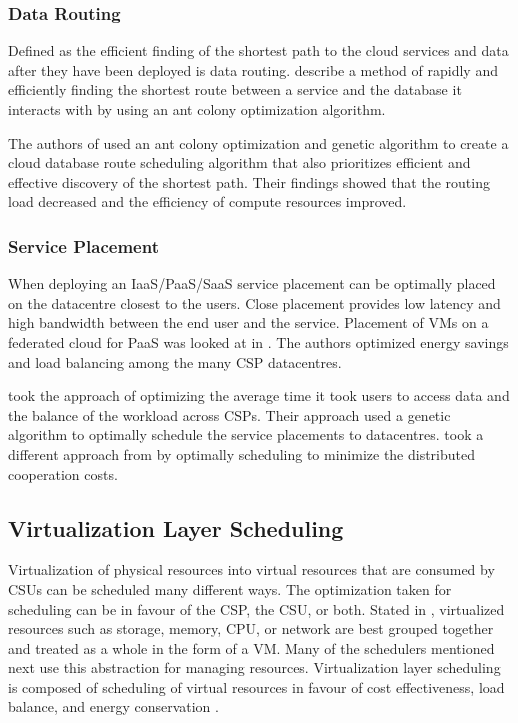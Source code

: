 \documentclass[12pt]{article}
\begin{document}
\subsubsection{Data Routing}

Defined as the efficient finding of the shortest path to the cloud services and data after they have been deployed is data routing. \cite{jia2010dynamic} describe a method of rapidly and efficiently finding the shortest route between a service and the database it interacts with by using an ant colony optimization algorithm.

The authors of \cite{yan2011optimization} used an ant colony optimization and genetic algorithm to create a cloud database route scheduling algorithm that also prioritizes efficient and effective discovery of the shortest path. Their findings showed that the routing load decreased and the efficiency of compute resources improved.



\subsubsection{Service Placement}

When deploying an IaaS/PaaS/SaaS service placement can be optimally placed on the datacentre closest to the users. Close placement provides low latency and high bandwidth between the end user and the service. Placement of VMs on a federated cloud for PaaS was looked at in \cite{agostinho2011bio}. The authors optimized energy savings and load balancing among the many CSP datacentres.

\cite{jindarak2011performance} took the approach of optimizing the average time it took users to access data and the balance of the workload across CSPs. Their approach used a genetic algorithm to optimally schedule the service placements to datacentres. \cite{guo2013data} took a different approach from \cite{jindarak2011performance} by optimally scheduling to minimize the distributed cooperation costs.






\subsection{Virtualization Layer Scheduling} \label{sub:virt-sched}

Virtualization of physical resources into virtual resources that are consumed by CSUs can be scheduled many different ways. The optimization taken for scheduling can be in favour of the CSP, the CSU, or both. Stated in \cite{xu2014managing}, virtualized resources such as storage, memory, CPU, or network are best grouped together and treated as a whole in the form of a VM. Many of the schedulers mentioned next use this abstraction for managing resources. Virtualization layer scheduling is composed of scheduling of virtual resources in favour of cost effectiveness, load balance, and energy conservation \cite{zhan2015cloud,Singh2016}.
\end{document}
